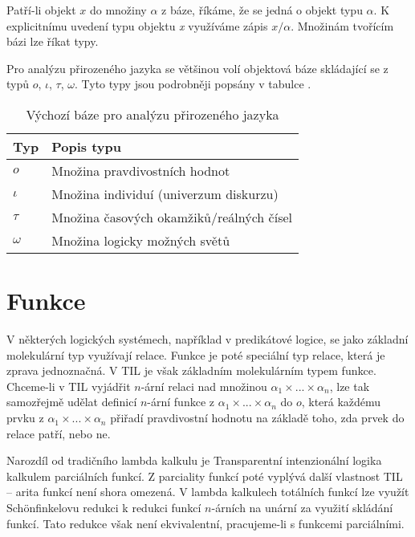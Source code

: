 Patří-li objekt $x$ do množiny $\alpha$ z báze, říkáme, že se jedná o objekt typu $\alpha$.
K explicitnímu uvedení typu objektu \textit{x} využíváme zápis $x/\alpha$. Množinám tvořícím bázi
lze říkat typy.

Pro analýzu přirozeného jazyka se většinou volí objektová báze skládající se z typů {$o$, $\iota$,
$\tau$, $\omega$}. Tyto typy jsou podrobněji popsány v tabulce .

\begin{table}
    \caption{Výchozí báze pro analýzu přirozeného jazyka}\label{tab:default-base}
    \centering

    \begin{tabular} { | l l | }
        \hline
        Typ      & Popis typu \\
        \hline
        $o$      & Množina pravdivostních hodnot \\
        $\iota$  & Množina individuí (univerzum diskurzu) \\
        $\tau$   & Množina časových okamžiků/reálných čísel \\
        $\omega$ & Množina logicky možných světů \\
        \hline
    \end{tabular}
\end{table}

\section{Funkce}\label{fn-arity}

V některých logických systémech, například v predikátové logice, se jako základní molekulární typ
využívají relace. Funkce je poté speciální typ relace, která je zprava jednoznačná. V TIL je však
základním molekulárním typem funkce. Chceme-li v TIL vyjádřit $n$-ární relaci nad množinou
$\alpha_1 \times ... \times \alpha_n$, lze tak samozřejmě udělat definicí $n$-ární funkce
z $\alpha_1 \times ... \times \alpha_n$ do $o$, která každému prvku
z $\alpha_1 \times ... \times \alpha_n$ přiřadí pravdivostní hodnotu na základě toho, zda prvek
do relace patří, nebo ne.

Narozdíl od tradičního lambda kalkulu je Transparentní intenzionální logika kalkulem parciálních
funkcí. Z parciality funkcí poté vyplývá další vlastnost TIL -- arita funkcí není shora omezená.
V lambda kalkulech totálních funkcí lze využít Sch{\"o}nfinkelovu redukci k redukci funkcí
$n$-árních na unární za využití skládání funkcí. Tato redukce však není ekvivalentní, pracujeme-li
s funkcemi parciálními.

